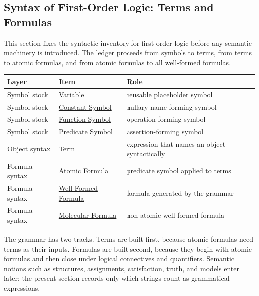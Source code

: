 
\subsection{Syntax of First-Order Logic: Terms and Formulas}

\begin{remark*}
This section fixes the syntactic inventory for first-order logic before any
semantic machinery is introduced. The ledger proceeds from symbols to terms,
from terms to atomic formulas, and from atomic formulas to all well-formed
formulas.

\begin{center}
\small
\begin{tabular}{l l l}
\toprule
\textbf{Layer} & \textbf{Item} & \textbf{Role} \\
\midrule
Symbol stock & \hyperref[def:variable]{Variable} & reusable placeholder symbol \\
Symbol stock & \hyperref[def:constant-symbol]{Constant Symbol} & nullary name-forming symbol \\
Symbol stock & \hyperref[def:function-symbol]{Function Symbol} & operation-forming symbol \\
Symbol stock & \hyperref[def:predicate-symbol]{Predicate Symbol} & assertion-forming symbol \\
Object syntax & \hyperref[def:term]{Term} & expression that names an object syntactically \\
Formula syntax & \hyperref[def:atomic-formula]{Atomic Formula} & predicate symbol applied to terms \\
Formula syntax & \hyperref[def:wff-pred]{Well-Formed Formula} & formula generated by the grammar \\
Formula syntax & \hyperref[def:molecular]{Molecular Formula} & non-atomic well-formed formula \\
\bottomrule
\end{tabular}
\end{center}
\end{remark*}

\begin{remark*}[Exposition]
The grammar has two tracks. Terms are built first, because atomic formulas need
terms as their inputs. Formulas are built second, because they begin with atomic
formulas and then close under logical connectives and quantifiers. Semantic
notions such as structures, assignments, satisfaction, truth, and models enter
later; the present section records only which strings count as grammatical
expressions.
\end{remark*}

